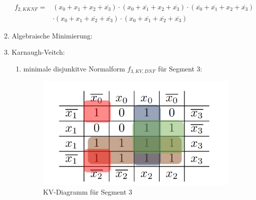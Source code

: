 \documentclass[a4paper]{article}
\begin{document}
\begin{enumerate}[label=\alph*)]
	\begin{equation*}
	\begin{aligned}
		f_{2, KKNF} = &(x_0 + x_1 + x_2 + \overline{x_3}) \cdot (x_0 + \overline{x_1} + x_2 + \overline{x_3}) \cdot (\overline{x_0} + \overline{x_1} + x_2 + \overline{x_3})\\ &\cdot (x_0 + x_1 + \overline{x_2} + \overline{x_3}) \cdot (x_0 + \overline{x_1} + \overline{x_2} + \overline{x_3})
	\end{aligned}
	\end{equation*}
	
	\clearpage
	\item Algebraische Minimierung:
	
	\item Karnaugh-Veitch:
	\begin{enumerate}[label=\roman*)]
		\item minimale disjunkitve Normalform $f_{3, KV, DNF}$ für Segment 3:
		
		\begin{figure}[h]
			\begin{center}
				\includegraphics[scale=0.25]{KV-Segment-3.png}
			\end{center}
			\caption{KV-Diagramm für Segment 3}
		\end{figure}
	

\end{enumerate}
\end{enumerate}
\end{document}
